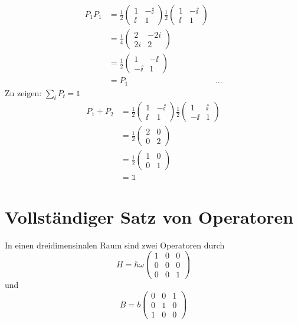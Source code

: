 \begin{align*}
    P_1P_1 &= 
    \frac 12 \begin{pmatrix} 1 &-\ii \\ \ii & 1 \end{pmatrix} 
        \frac 12 \begin{pmatrix} 1 & -\ii \\ \ii & 1 \end{pmatrix} \\
                                   &= \frac 14 \begin{pmatrix} 2 & -2i \\ 2i & 2 \end{pmatrix} \\
                                   &=\frac 12 \begin{pmatrix} 1 &-\ii \\ -\ii & 1 \end{pmatrix} \\
                                   &=P_1
    &...
\end{align*}
Zu zeigen: $\sum_\ii P_\ii = \mathbb{1}$
\begin{align*}
    P_1+P_2 &= \frac 12 \begin{pmatrix} 1 &-\ii \\ \ii & 1 \end{pmatrix} 
        \frac 12 \begin{pmatrix} 1 & \ii \\ -\ii & 1 \end{pmatrix} \\
                                   &= \frac 12 \begin{pmatrix} 2 & 0 \\ 0 & 2 \end{pmatrix} \\
                                   &=\frac 12 \begin{pmatrix} 1 & 0 \\ 0 & 1 \end{pmatrix} \\
                                   &= \mathbb{1}
\end{align*}

\section{Vollständiger Satz von Operatoren}

In einen dreidimensinalen Raum sind zwei Operatoren durch
\[
    H = \hbar\omega 
    \begin{pmatrix}
        1 & 0 & 0 \\
        0 & 0 & 0 \\
        0 & 0 & 1
    \end{pmatrix}
\]
und
\[
    B = b
    \begin{pmatrix}
        0 & 0 & 1 \\
        0 & 1 & 0 \\
        1 & 0 & 0 
    \end{pmatrix}
\]


